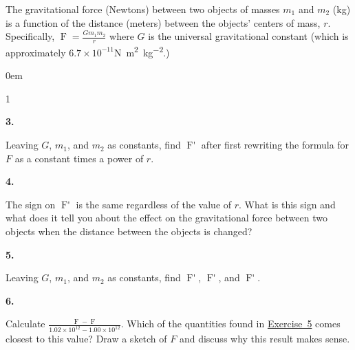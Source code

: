\documentclass[12pt,]{book}
\theoremstyle{plain}
\theoremstyle{definition}
\numberwithin{equation}{section}
\newenvironment{exercisegroup}%
{\medskip\noindent}%
{\par\bigskip}%
\newlength{\exercisegroupindent}%
\newlength{\exercisegroupitemwidth}%
\newenvironment{exercisegrouplist}%
{\vspace{-\partopsep}%
\begin{adjustwidth}{\exercisegroupindent}{0em}}%
{\end{adjustwidth}%
\vspace{-\partopsep}%
\vspace{\baselineskip}}%
\newenvironment{exercisegroupbycol}[1]%
{\begin{exercisegrouplist}%
\vspace{-\multicolsep}%
\begin{multicols}{#1}%
\setlength{\parindent}{0em}%
\setlength{\exercisegroupitemwidth}{\linewidth}}%
{\end{multicols}%
\vspace{-\multicolsep}%
\end{exercisegrouplist}}%
\newenvironment{exercisegroupitem}[1]%
{\begin{minipage}[t]{\exercisegroupitemwidth}
\vspace{0pt}%
{\bfseries#1}%
\rule{0pt}{\baselineskip}}{\strut%
\end{minipage}%
\hspace{\columnsep}}%
\providecommand\phantomsection{}
\newcommand{\fe}[2]{\mathop{{#1}{\left(#2\right)}}}
\newcommand{\fd}[1]{#1'}
\begin{document}
\begin{exercisegroup}%
The gravitational force (Newtons) between two objects of masses \(m_1\) and \(m_2\) (\si{\kilo\gram}) is a function of the distance (meters) between the objects' centers of mass, \(r\).    Specifically, \(\fe{F}{r}=\frac{Gm_1m_2}{r}\) where \(G\) is the universal gravitational constant (which is approximately \(6.7\times10^{-11}\)\si{\newton\meter\tothe{2}\per\kilo\gram\tothe{2}}.)%
\par
\begin{exercisegroupbycol}{1}%
\begin{exercisegroupitem}{3. }\phantomsection\hypertarget{exercise-333}{\null}
Leaving \(G\), \(m_1\), and \(m_2\) as constants, find \(\fe{\fd{F}}{r}\) after first rewriting the formula for \(F\) as a constant times a power of \(r\).%
\end{exercisegroupitem}%
\par%
\begin{exercisegroupitem}{4. }\phantomsection\hypertarget{exercise-334}{\null}
The sign on \(\fe{\fd{F}}{r}\) is the same regardless of the value of \(r\).  What is this sign and what does it tell you about the effect on the gravitational force between two objects when the distance between the objects is changed?%
\end{exercisegroupitem}%
\par%
\begin{exercisegroupitem}{5. }\phantomsection\hypertarget{exercise-evaluate-gravity}{\null}
Leaving \(G\), \(m_1\), and \(m_2\) as constants, find \(\fe{\fd{F}}{1.00\times10^{12}}\), \(\fe{\fd{F}}{1.01\times10^{12}}\), and \(\fe{\fd{F}}{1.02\times10^{12}}\).%
\end{exercisegroupitem}%
\par%
\begin{exercisegroupitem}{6. }\phantomsection\hypertarget{exercise-336}{\null}
Calculate \(\frac{\fe{F}{1.02\times10^{12}}-\fe{F}{1.00\times10^{12}}}{1.02\times10^{12}-1.00\times10^{12}}\). Which of the quantities found in \hyperref[exercise-evaluate-gravity]{Exercise~5} comes closest to this value?  Draw a sketch of \(F\) and discuss why this result makes sense.%
\end{exercisegroupitem}%
\par%
\end{exercisegroupbycol}%
\end{exercisegroup}%
\typeout{************************************************}
\typeout{************************************************}
\end{document}
